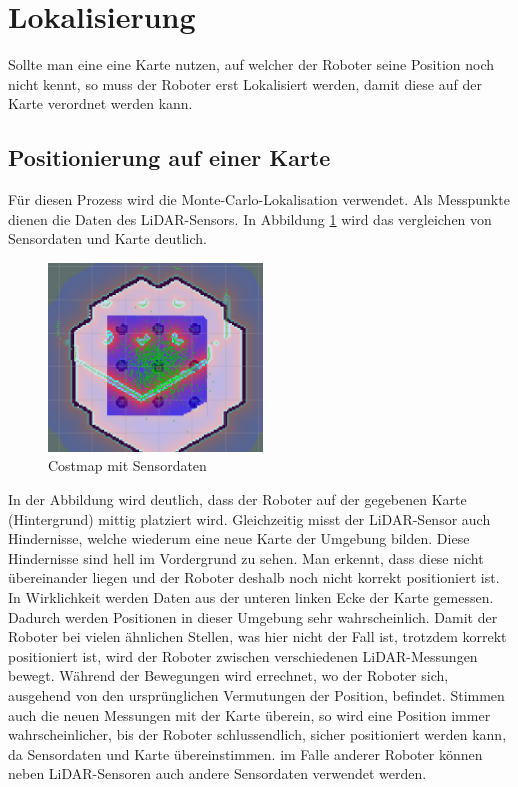 \section{Lokalisierung}
{	
	Sollte man eine eine Karte nutzen, auf welcher der Roboter seine Position noch nicht kennt, so muss der Roboter erst Lokalisiert werden, damit diese auf der Karte verordnet werden kann.
	\subsection{Positionierung auf einer Karte}
	{
		
	Für diesen Prozess wird die Monte-Carlo-Lokalisation verwendet. Als Messpunkte dienen die Daten des LiDAR-Sensors. In Abbildung \ref{pic:costmontecarlo} wird das vergleichen von Sensordaten und Karte deutlich.
		\begin{figure}[H]
			\centering
			\includegraphics[height=5cm]{Bilder/costmap_monte_carlo_example.png}
			\caption{Costmap mit Sensordaten} 
			\label{pic:costmontecarlo}
		\end{figure}
		In der Abbildung wird deutlich, dass der Roboter auf der gegebenen Karte (Hintergrund) mittig platziert wird. Gleichzeitig misst der LiDAR-Sensor auch Hindernisse, welche wiederum eine neue Karte der Umgebung bilden. Diese Hindernisse sind hell im Vordergrund zu sehen. Man erkennt, dass diese nicht übereinander liegen und der Roboter deshalb noch nicht korrekt positioniert ist. In Wirklichkeit werden Daten aus der unteren linken Ecke der Karte gemessen. Dadurch werden Positionen in dieser Umgebung sehr wahrscheinlich. Damit der Roboter bei vielen ähnlichen Stellen, was hier nicht der Fall ist, trotzdem korrekt positioniert ist, wird der Roboter zwischen verschiedenen LiDAR-Messungen bewegt. Während der Bewegungen wird errechnet, wo der Roboter sich, ausgehend von den ursprünglichen Vermutungen der Position, befindet. Stimmen auch die neuen Messungen mit der Karte überein, so wird eine Position immer wahrscheinlicher, bis der Roboter schlussendlich, sicher positioniert werden kann, da Sensordaten und Karte übereinstimmen. im Falle anderer Roboter können neben LiDAR-Sensoren auch andere Sensordaten verwendet werden.
		
}}
